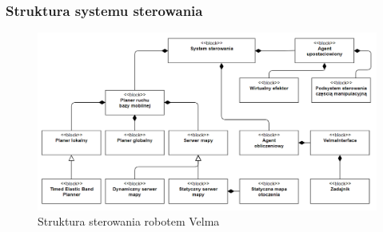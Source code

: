 \begin{frame}
    \frametitle{Struktura systemu sterowania} 
    \begin{figure}[b]
        \label{control_system}
        \centering
        \def\svgwidth{\columnwidth}
        \vspace{0.1cm}
        \includegraphics[scale=0.36]{images/control_system.png}
        \vspace{0.1cm}
        \caption{Struktura sterowania robotem Velma}
    \end{figure}
\end{frame}




